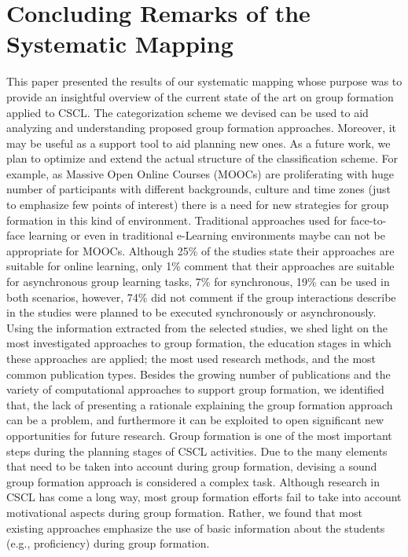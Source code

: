 \section{Concluding Remarks of the Systematic Mapping}

This paper presented the results of our systematic mapping whose purpose was to provide an insightful overview of the current state of the art on group formation applied to CSCL. The categorization scheme we devised can be used to aid analyzing and understanding proposed group formation approaches. Moreover, it may be useful as a support tool to aid planning new ones. As a future work, we plan to optimize and extend the actual structure of the classification scheme. For example, as Massive Open Online Courses (MOOCs) are proliferating with huge number of participants with different backgrounds, culture and time zones (just to emphasize few points of interest) there is a need for new strategies for group formation in this kind of environment. Traditional approaches used for face-to-face learning or even in traditional e-Learning environments maybe can not be appropriate for MOOCs. Although 25\% of the studies state their approaches are suitable for online learning, only 1\% comment that their approaches are suitable for asynchronous group learning tasks, 7\% for synchronous, 19\% can be used in both scenarios, however, 74\% did not comment if the group interactions describe in the studies were planned to be executed synchronously or asynchronously.
Using the information extracted from the selected studies, we shed light on the most investigated approaches to group formation, the education stages in which these approaches are applied; the most used research methods, and the most common publication types. Besides the growing number of publications and the variety of computational approaches to support group formation, we identified that, the lack of presenting a rationale explaining the group formation approach can be a problem, and furthermore it can be exploited to open significant new opportunities for future research.
Group formation is one of the most important steps during the planning stages of CSCL activities. Due to the many elements that need to be taken into account during group formation, devising a sound group formation approach is considered a complex task. Although research in CSCL has come a long way, most group formation efforts fail to take into account motivational aspects during group formation. Rather, we found that most existing approaches emphasize the use of basic information about the students (e.g., proficiency) during group formation. 
